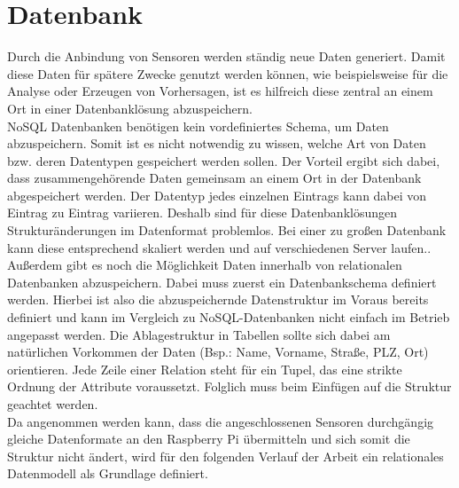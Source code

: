 \section{Datenbank}
Durch die Anbindung von Sensoren werden ständig neue Daten generiert. Damit diese Daten für spätere Zwecke genutzt werden können, wie beispielsweise für die Analyse oder Erzeugen von Vorhersagen, ist es hilfreich diese zentral an einem Ort in einer Datenbanklösung abzuspeichern.
\\NoSQL Datenbanken benötigen kein vordefiniertes Schema, um Daten abzuspeichern. Somit ist es nicht notwendig zu wissen, welche Art von Daten bzw. deren Datentypen gespeichert werden sollen. Der Vorteil ergibt sich dabei, dass zusammengehörende Daten gemeinsam an einem Ort in der Datenbank abgespeichert werden. Der Datentyp jedes einzelnen Eintrags kann dabei von Eintrag zu Eintrag variieren. Deshalb sind für diese Datenbanklösungen Strukturänderungen im Datenformat problemlos. Bei einer zu großen Datenbank kann diese entsprechend skaliert werden und auf verschiedenen Server laufen.\cite{noSQL:noSQL}.
\\Außerdem gibt es noch die Möglichkeit Daten innerhalb von relationalen Datenbanken abzuspeichern. Dabei muss zuerst ein Datenbankschema definiert werden. Hierbei ist also die abzuspeichernde Datenstruktur im Voraus bereits definiert und kann im Vergleich zu NoSQL-Datenbanken nicht einfach im Betrieb angepasst werden. Die Ablagestruktur in Tabellen sollte sich dabei am natürlichen Vorkommen der Daten (Bsp.: Name, Vorname, Straße, PLZ, Ort)  orientieren. Jede Zeile einer Relation steht für ein Tupel, das eine strikte Ordnung der Attribute voraussetzt\cite{codd:Codd}. Folglich muss beim Einfügen auf die Struktur geachtet werden.
\\Da angenommen werden kann, dass die angeschlossenen Sensoren durchgängig gleiche Datenformate an den Raspberry Pi übermitteln und sich somit die Struktur nicht ändert, wird für den folgenden Verlauf der Arbeit ein relationales Datenmodell als Grundlage definiert.
